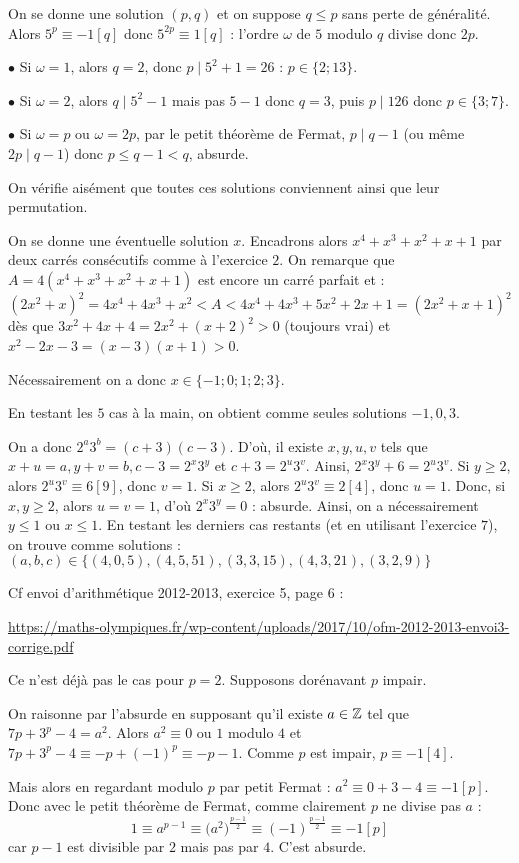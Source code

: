\begin{sol}
On se donne une solution $(p,q)$ et on suppose $q\le p$ sans perte de généralité. Alors $5^p\equiv-1[q]$ donc $5^{2p}\equiv1[q]$ : l'ordre $\omega$ de $5$ modulo $q$ divise donc $2p$.

$\bullet$ Si $\omega=1$, alors $q=2$, donc $p\mid5^2+1=26$ : $p\in\{2;13\}.$

$\bullet$ Si $\omega=2$, alors $q\mid5^2-1$ mais pas $5-1$ donc $q=3$, puis $p\mid126$ donc $p\in\{3;7\}$.

$\bullet$ Si $\omega=p$ ou $\omega=2p$, par le petit théorème de Fermat, $p\mid q-1$ (ou même $2p\mid q-1$) donc $p\le q-1<q$, absurde.

On vérifie aisément que toutes ces solutions conviennent ainsi que leur permutation.
\end{sol}


\begin{sol}
On se donne une éventuelle solution $x$. Encadrons alors $x^4+x^3+x^2+x+1$ par deux carrés consécutifs comme à l'exercice $2$.
On remarque que $A=4(x^4+x^3+x^2+x+1)$ est encore un carré parfait et :
$$(2x^2+x)^2=4x^4+4x^3+x^2<A<4x^4+4x^3+5x^2+2x+1=(2x^2+x+1)^2$$
dès que $3x^2+4x+4=2x^2+(x+2)^2>0$ (toujours vrai) et $x^2-2x-3=(x-3)(x+1)>0$.

Nécessairement on a donc $x\in\{-1;0;1;2;3\}$.

En testant les $5$ cas à la main, on obtient comme seules solutions $-1,0,3$.
\end{sol}


\begin{sol}
On a donc $2^a3^b=(c+3)(c-3)$.
D'où, il existe $x,y,u,v$ tels que $x+u=a, y+v=b, c-3=2^x3^y$ et $c+3=2^u3^v$. Ainsi, $2^x3^y+6=2^u3^v$.
Si $y\ge2$, alors $2^u3^v\equiv6[9]$, donc $v=1$.
Si $x\ge2$, alors $2^u3^v\equiv2[4]$, donc $u=1$.
Donc, si $x,y\ge2$, alors $u=v=1$, d'où $2^x3^y=0$ : absurde.
Ainsi, on a nécessairement $y\le1$ ou $x\le1$.
En testant les derniers cas restants (et en utilisant l'exercice $7$), on trouve comme solutions : $(a,b,c)\in \{(4,0,5),(4,5,51),(3,3,15),(4,3,21),(3,2,9)\}$
\end{sol}


\begin{sol}
Cf envoi d'arithmétique 2012-2013, exercice 5, page 6 :

\url{https://maths-olympiques.fr/wp-content/uploads/2017/10/ofm-2012-2013-envoi3-corrige.pdf}
\end{sol}


\begin{sol}
Ce n'est déjà pas le cas pour $p=2$. Supposons dorénavant $p$ impair.

On raisonne par l'absurde en supposant qu'il existe $a\in\mathbb Z$ tel que $7p+3^p-4=a^2$.
Alors $a^2\equiv0$ ou $1$ modulo $4$ et $7p+3^p-4\equiv-p+(-1)^p\equiv-p-1$.
Comme $p$ est impair, $p\equiv-1[4]$.

Mais alors en regardant modulo $p$ par petit Fermat : $a^2\equiv0+3-4\equiv-1[p]$.
Donc avec le petit théorème de Fermat, comme clairement $p$ ne divise pas $a$ : $$1\equiv a^{p-1}\equiv\big(a^2\big)^{\frac{p-1}2}\equiv(-1)^{\frac{p-1}2}\equiv-1[p]$$
car $p-1$ est divisible par $2$ mais pas par $4$. C'est absurde.
\end{sol}



